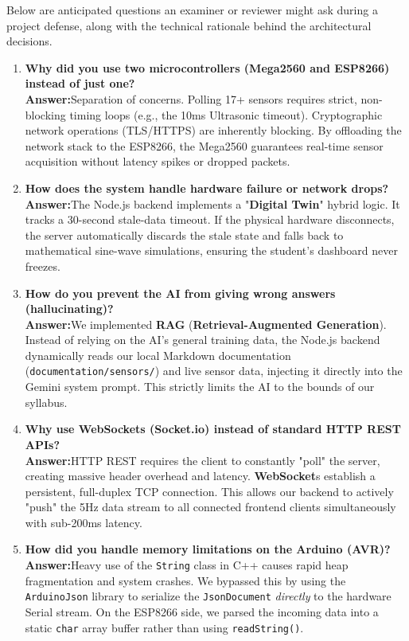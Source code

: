 \documentclass[12pt,a4paper]{article}
\newcommand{\keyword}[1]{\textcolor{keywordcolor}{\textbf{#1}}}
\newcommand{\Q}[1]{\textcolor{questioncolor}{\textbf{#1}}}
\newcommand{\A}{\textcolor{answercolor}{\textbf{Answer:}}}
\begin{document}
Below are anticipated questions an examiner or reviewer might ask during a project defense, along with the technical rationale behind the architectural decisions.

\begin{enumerate}
    \item \Q{Why did you use two microcontrollers (Mega2560 and ESP8266) instead of just one?} \\
    \A Separation of concerns. Polling 17+ sensors requires strict, non-blocking timing loops (e.g., the 10ms Ultrasonic timeout). Cryptographic network operations (TLS/HTTPS) are inherently blocking. By offloading the network stack to the ESP8266, the Mega2560 guarantees real-time sensor acquisition without latency spikes or dropped packets.

    \item \Q{How does the system handle hardware failure or network drops?} \\
    \A The Node.js backend implements a "\keyword{Digital Twin}" hybrid logic. It tracks a 30-second stale-data timeout. If the physical hardware disconnects, the server automatically discards the stale state and falls back to mathematical sine-wave simulations, ensuring the student's dashboard never freezes.

    \item \Q{How do you prevent the AI from giving wrong answers (hallucinating)?} \\
    \A We implemented \keyword{RAG} (\keyword{Retrieval-Augmented Generation}). Instead of relying on the AI's general training data, the Node.js backend dynamically reads our local Markdown documentation (\texttt{documentation/sensors/}) and live sensor data, injecting it directly into the Gemini system prompt. This strictly limits the AI to the bounds of our syllabus.

    \item \Q{Why use \keyword{WebSocket}s (Socket.io) instead of standard HTTP REST APIs?} \\
    \A HTTP REST requires the client to constantly "poll" the server, creating massive header overhead and latency. \keyword{WebSocket}s establish a persistent, full-duplex TCP connection. This allows our backend to actively "push" the 5Hz data stream to all connected frontend clients simultaneously with sub-200ms latency.

    \item \Q{How did you handle memory limitations on the Arduino (AVR)?} \\
    \A Heavy use of the \texttt{String} class in C++ causes rapid heap fragmentation and system crashes. We bypassed this by using the \texttt{ArduinoJson} library to serialize the \texttt{JsonDocument} \textit{directly} to the hardware Serial stream. On the ESP8266 side, we parsed the incoming data into a static \texttt{char} array buffer rather than using \texttt{readString()}.
\end{enumerate}
\end{document}
